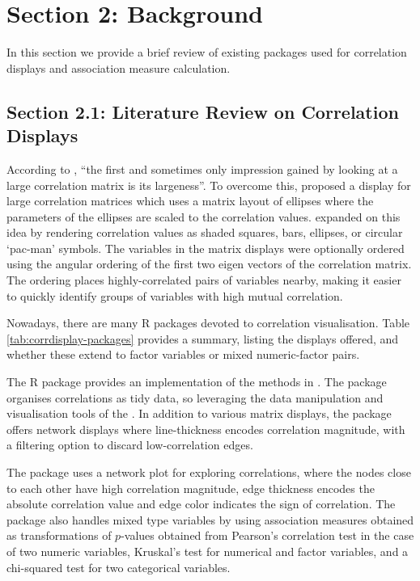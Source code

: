\hypertarget{section-2-background}{%
\section{Section 2: Background}\label{section-2-background}}

In this section we provide a brief review of existing packages used for
correlation displays and association measure calculation.

\hypertarget{section-2.1-literature-review-on-correlation-displays}{%
\subsection{Section 2.1: Literature Review on Correlation
Displays}\label{section-2.1-literature-review-on-correlation-displays}}

According to \citet{hills1969looking}, ``the first and sometimes only
impression gained by looking at a large correlation matrix is its
largeness''. To overcome this, \citet{murdoch1996graphical} proposed a
display for large correlation matrices which uses a matrix layout of
ellipses where the parameters of the ellipses are scaled to the
correlation values. \citet{friendly2002corrgrams} expanded on this idea
by rendering correlation values as shaded squares, bars, ellipses, or
circular `pac-man' symbols. The variables in the matrix displays were
optionally ordered using the angular ordering of the first two eigen
vectors of the correlation matrix. The ordering places highly-correlated
pairs of variables nearby, making it easier to quickly identify groups
of variables with high mutual correlation.

Nowadays, there are many R packages devoted to correlation
visualisation. Table \ref{tab:corrdisplay-packages} provides a summary,
listing the displays offered, and whether these extend to factor
variables or mixed numeric-factor pairs.

The R package  \citep{corrplot2021} provides an
implementation of the methods in \citet{friendly2002corrgrams}. The
package  \citep{corrr2020} organises correlations as tidy
data, so leveraging the data manipulation and visualisation tools of the
 \citep{tidyverse}. In addition to various matrix
displays, the package offers network displays where line-thickness
encodes correlation magnitude, with a filtering option to discard
low-correlation edges.

The package  \citep{corrgrapher} uses a network
plot for exploring correlations, where the nodes close to each other
have high correlation magnitude, edge thickness encodes the absolute
correlation value and edge color indicates the sign of correlation. The
package also handles mixed type variables by using association measures
obtained as transformations of \(p\)-values obtained from Pearson's
correlation test in the case of two numeric variables, Kruskal's test
for numerical and factor variables, and a chi-squared test for two
categorical variables.

